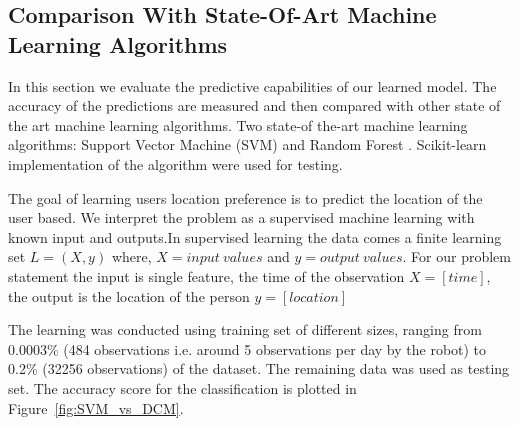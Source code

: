 \FloatBarrier


\subsection{Comparison With State-Of-Art Machine Learning Algorithms}

In this section we evaluate the predictive capabilities of our learned model. The accuracy of the predictions are measured and then compared with other state of the art machine learning algorithms. Two state-of the-art machine learning algorithms: Support Vector Machine (SVM)\citep{boser1992training, cortes1995support} and Random Forest \citep{breiman2001random, geurts2006extremely}. Scikit-learn \citep{sklearn_api} implementation of the algorithm were used for testing.

The goal of learning users location preference is to predict the location of the user based. We interpret the problem as a supervised machine learning with known input and outputs.In supervised learning the data comes a finite learning set $L =  (X, y)$ where, $X = input\ values$ and $y = output\ values$. 
For our problem statement the input is single feature, the time of the observation $X = [time]$, the output is the location of the person $y=[location]$

The learning was conducted using training set of different sizes, ranging from 0.0003\% (484 observations i.e. around 5 observations per day by the robot) to 0.2\% (32256 observations) of the dataset. The remaining data was used as testing set. The accuracy score for the classification is plotted in Figure~\ref{fig:SVM_vs_DCM}. 


